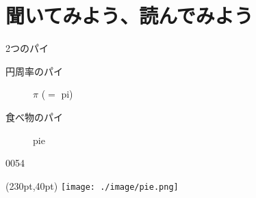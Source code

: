 \documentclass[aspectratio=169,xcolor={dvipsnames,table}]{beamer}
\begin{document}
\section{聞いてみよう、読んでみよう}
\begin{frame}[plain]{2つのパイ}
\Large
\begin{description}
 \item[円周率のパイ] {\Huge $\pi$\,\,($=$ pi)}
 \item[食べ物のパイ] {\Huge pie}
\end{description}

\vspace{40pt}


{\tiny 0054}\,{\scriptsize {}}

\begin{textblock*}{0.6\linewidth}(230pt,40pt)
\texttt{[image: ./image/pie.png]}
\end{textblock*}

\end{frame}
\end{document}
